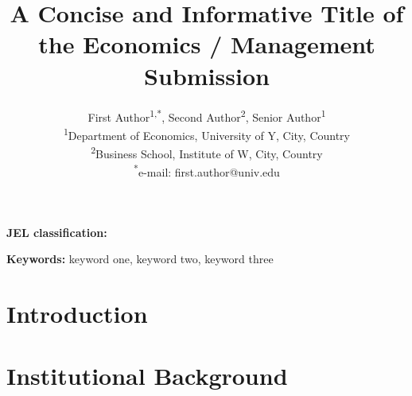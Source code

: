 \documentclass[11pt,a4paper]{article}
\title{A Concise and Informative Title of the Economics / Management Submission}
\author{First Author\textsuperscript{1,*}, Second Author\textsuperscript{2}, Senior Author\textsuperscript{1}\\
\textsuperscript{1}Department of Economics, University of Y, City, Country\\
\textsuperscript{2}Business School, Institute of W, City, Country\\
\textsuperscript{*}e-mail: first.author@univ.edu}
\date{}
\begin{document}
\maketitle

\begin{abstract}
\end{abstract}

\noindent\textbf{JEL classification:} %

\noindent\textbf{Keywords:} %
keyword one, keyword two, keyword three

\section{Introduction}
\label{sec:intro}

\section{Institutional Background}
\label{sec:background}

\end{document}
